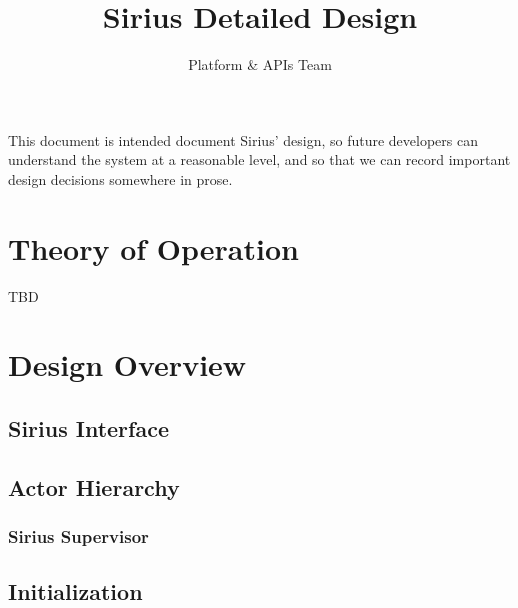 \documentclass[11pt]{article}
\begin{document}
\title{Sirius Detailed Design}
\author{Platform \& APIs Team}
\maketitle

This document is intended document Sirius’ design, so future developers can understand the system at a reasonable level, and so that we can record important design decisions somewhere in prose.  

\section{Theory of Operation}
TBD


\section{Design Overview}
\subsection{Sirius Interface}

\subsection{Actor Hierarchy}

\subsubsection{Sirius Supervisor}

\subsection{Initialization}
\end{document}
